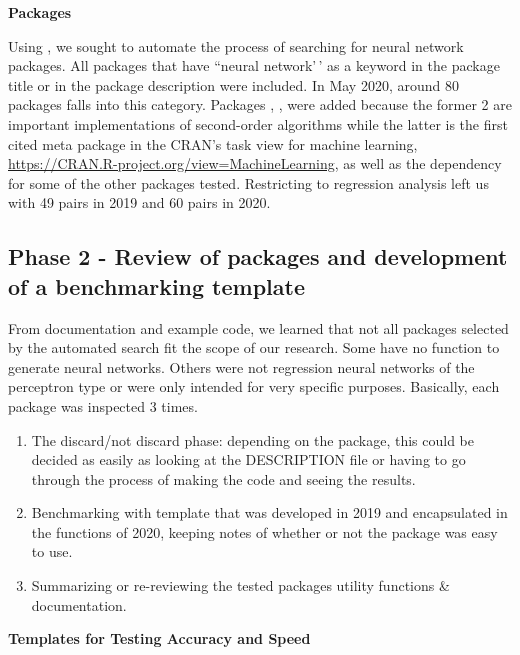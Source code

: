 \textbf{Packages}

Using  \citep{R-RWsearch}, we sought to automate the
process of searching for neural network packages. All packages that have
``neural network'\,' as a keyword in the package title or in the package
description were included. In May 2020, around 80 packages falls into
this category. Packages , ,  were
added because the former 2 are important implementations of second-order
algorithms while the latter is the first cited meta package in the
CRAN's task view for machine learning,
\url{https://CRAN.R-project.org/view=MachineLearning}, as well as the
dependency for some of the other packages tested. Restricting to
regression analysis left us with 49  pairs in
2019 and 60  pairs in 2020.

\hypertarget{phase-2---review-of-packages-and-development-of-a-benchmarking-template}{%
\subsection{Phase 2 - Review of packages and development of a
benchmarking
template}\label{phase-2---review-of-packages-and-development-of-a-benchmarking-template}}

From documentation and example code, we learned that not all packages
selected by the automated search fit the scope of our research. Some
have no function to generate neural networks. Others were not regression
neural networks of the perceptron type or were only intended for very
specific purposes. Basically, each package was inspected 3 times.

\begin{enumerate}
\def\labelenumi{\arabic{enumi}.}
\item
  The discard/not discard phase: depending on the package, this could be
  decided as easily as looking at the DESCRIPTION file or having to go
  through the process of making the code and seeing the results.
\item
  Benchmarking with template that was developed in 2019 and encapsulated
  in the functions of 2020, keeping notes of whether or not the package
  was easy to use.
\item
  Summarizing or re-reviewing the tested packages utility functions \&
  documentation.
\end{enumerate}

\textbf{Templates for Testing Accuracy and Speed}

